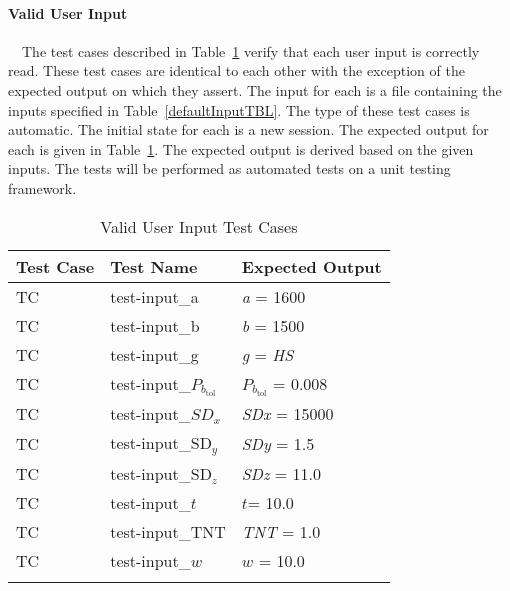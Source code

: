 \documentclass[12pt]{article}
\newcounter{utestnum} %
\begin{document}
\paragraph{Valid User Input}

~\newline ~\newline \noindent The test cases described in Table~\ref{InputTests} 
verify that each user input is correctly read. These test cases are identical 
to each other with the exception of the expected output on which they assert. 
The input for each is a file containing the inputs specified in 
Table~\ref{defaultInputTBL}. The type of these test cases is automatic. The initial 
state for each is a new session. The expected output for each is given in 
Table~\ref{InputTests}. The expected output is derived based on the given 
inputs. The tests will be performed as automated tests on a unit testing 
framework.



\begin{longtable}{  l  p{4cm}  p{6cm}  }
	\hline
	\textbf{Test Case} & \textbf{Test Name} & \textbf{Expected Output} \\
	\hline
	TC{utestnum}\theutestnum  \label{TC_Length} & 
	test-input\_a &  \textit{a} = 1600\\
	\hline 
	TC{utestnum}\theutestnum  \label{TC_Breadth} & 
	test-input\_b &  \textit{b} = 1500\\ 
	\hline
	TC{utestnum}\theutestnum  \label{TC_GlassType} & 
	test-input\_g &  \textit{g} = \textit{HS}\\ 
	\hline
	TC{utestnum}\theutestnum  \label{TC_PbTol} & 
	test-input\_$P_{b_\text{tol}}$ &  $P_{b_\text{tol}}$ = 0.008\\ 
	\hline
	TC{utestnum}\theutestnum  \label{TC_SDx} & 
	test-input\_${SD}_x$ &  \textit{SDx} = 15000\\ 
	\hline
	TC{utestnum}\theutestnum  \label{TC_Sdy} & 
	test-input\_$\text{SD}_y$ &  \textit{SDy} = 1.5\\
	\hline 
	TC{utestnum}\theutestnum  \label{TC_SDz} & 
	test-input\_$\text{SD}_z$ &  \textit{SDz} = 11.0\\ 
	\hline
	TC{utestnum}\theutestnum  \label{TC_Thickness} & 
	test-input\_$t$ &  $t$= 10.0\\ 
	\hline
	TC{utestnum}\theutestnum  \label{TC_TNT} & 
	test-input\_TNT &  \textit{TNT} = 1.0\\ 
	\hline
	TC{utestnum}\theutestnum  \label{TC_W} & 
	test-input\_$w$ &  $w$ = 10.0\\ 
	\hline
	\caption{Valid User Input Test Cases}
	\label{InputTests}
\end{longtable}
\end{document}
